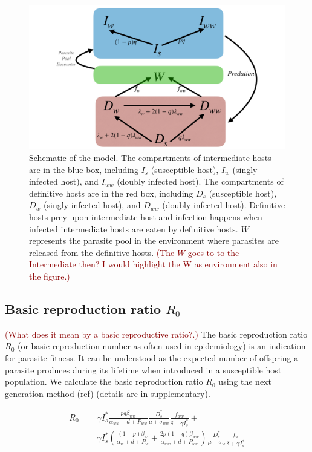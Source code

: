 \documentclass[11pt]{article}
\newcommand{\cha}[1]{\textcolor{darkred}{(#1)}}
\begin{document}
\begin{figure}[ht!]
\includegraphics[width=\textwidth]{Figures/schematic.pdf}
\caption{Schematic of the model. The compartments of intermediate hosts are in the blue box, including $I_s$ (susceptible host), $I_w$ (singly infected host), and $I_{ww}$ (doubly infected host). The compartments of definitive hosts are in the red box, including $D_s$ (susceptible host), $D_w$ (singly infected host), and $D_{ww}$ (doubly infected host). Definitive hosts prey upon intermediate host and infection happens when infected intermediate hosts are eaten by definitive hosts. 
$W$ represents the parasite pool in the environment where parasites are released from the definitive hosts.
\cha{The $W$ goes to to the Intermediate then? I would highlight the W as environment also in the figure.}
}
\label{fig:schematic}
\end{figure}

\subsection*{Basic reproduction ratio $R_0$}

\cha{What does it mean by a basic reproductive ratio?.}
The basic reproduction ratio $R_0$ (or basic reproduction number as often used in epidemiology) is an indication for parasite fitness. It can be understood as the expected number of offspring a parasite produces during its lifetime when introduced in a susceptible host population. We calculate the basic reproduction ratio $R_0$ using the next generation method (ref) (details are in supplementary).  

\begin{align}
R_0 = & \gamma I_s^* \frac{ p q \beta_{ww}}{\alpha_{ww} + d + P_{ww}} \frac{D_s^*}{\mu +\sigma_{ww}} \frac{f_{ww}}{\delta +\gamma I_s^*} + \nonumber \\
& \gamma  I_s^* \left( \frac{ (1-p)\beta_w}{\alpha_w + d + P_w} + \frac{2 p (1-q) \beta_{ww}}{\alpha_{ww} + d + P_{ww}} \right) \frac{D_s^*}{\mu + \sigma_w} \frac{f_w}{\delta +\gamma  I_s^*}
\end{align}
\end{document}
